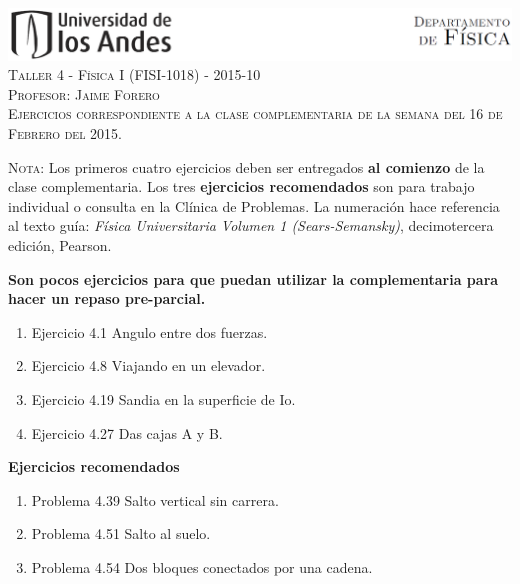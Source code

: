 \documentclass[letterpaper,10pt,onecolumn]{article}
\begin{document}
\begin{center}

\includegraphics[width=490pt]{header.png}\\[0.5cm]

\textsc{\LARGE Taller 4 - F\'isica I (FISI-1018) - 2015-10}\\[0.5cm]

\textsc{\Large{Profesor: Jaime Forero}} \\[0.5cm]

\noindent\textsc{Ejercicios correspondiente a la clase complementaria
  de la semana del 16 de Febrero del 2015.}\\[0.5cm]
\end{center}

\noindent\textsc{Nota:} Los primeros cuatro ejercicios deben ser
entregados {\bf al comienzo} de la clase complementaria.  Los tres {\bf
  ejercicios recomendados}  son para trabajo individual o consulta en
la Cl\'inica de Problemas. La numeraci\'on hace referencia al texto
gu\'ia: \textit{F\'isica Universitaria Volumen  1 (Sears-Semansky)},
decimotercera edici\'on, Pearson. 

{\bf Son pocos ejercicios para que puedan utilizar la complementaria
  para hacer un repaso pre-parcial.}  

\begin{enumerate}
\item Ejercicio 4.1 Angulo entre dos fuerzas.
\item Ejercicio 4.8  Viajando en un elevador.
\item Ejercicio 4.19 Sandia en la superficie de Io.
\item Ejercicio 4.27 Das cajas A y B. 
\end{enumerate}

{\bf Ejercicios recomendados}\\
\begin{enumerate}
\item Problema 4.39 Salto vertical sin carrera.
\item Problema 4.51 Salto al suelo.
\item Problema 4.54 Dos bloques conectados por una cadena.
\end{enumerate}
\end{document}
